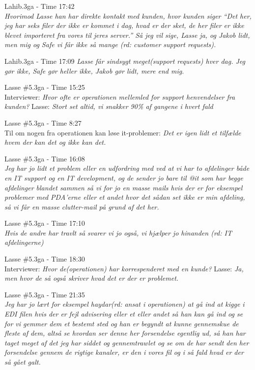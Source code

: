 \begin{thebibliography}{9}
	Lahib.3ga - Time 17:42\\
	\textit{Hvorimod Lasse han har direkte kontakt med kunden, hvor kunden siger “Det her, jeg har seks filer der ikke er kommet i dag, hvad er der sket, de her filer er ikke blevet importeret fra vores til jeres server.” Så jeg vil sige, Lasse ja, og Jakob lidt, men mig og Safe vi får ikke så mange \emph{(rd: customer support requests)}.}

	Lahib.3ga - Time 17:09
	\textit{Lasse får sindsygt meget(support requests) hver dag. Jeg gør ikke, Safe gør heller ikke, Jakob gør lidt, mere end mig.}

	Lasse \#5.3ga - Time 15:25 \\
	Interviewer: \textit{Hvor ofte er operationen mellemled for support henvendelser fra kunden?} Lasse: \textit{Stort set altid, vi snakker 90\% af gangene i hvert fald}

	Lasse \#5.3ga - Time 8:27 \\
	Til om nogen fra operationen kan løse it-problemer: \textit{Det er igen lidt et tilfælde hvem der kan det og ikke kan det.}

	Lasse \#5.3ga - Time 16:08 \\
	\textit{Jeg har jo lidt et problem eller en udfordring med ved at vi har to afdelinger både en IT support og en IT development, og de sender jo bare til @it som har begge afdelinger blandet sammen så vi for jo en masse mails hvis der er for eksempel problemer med PDA’erne eller et andet hvor det sådan set ikke er min afdeling, så vi får en masse clutter-mail på grund af det her.}

	Lasse \#5.3ga - Time 17:10 \\
	\textit{Hvis de andre har travlt så svarer vi jo også, vi hjælper jo hinanden \emph{(rd: IT afdelingerne)}}

	Lasse \#5.3ga - Time 18:30 \\
	Interviewer: \textit{Hvor de(operationen) har korrespenderet med en kunde?} Lasse: \textit{Ja, men hvor de så også skriver hvad det er der er problemet.}

	Lasse \#5.3ga - Time 21:35 \\
	\textit{Jeg har jo lært for eksempel haydar\emph{(rd: ansat i operationen)} at gå ind at kigge i EDI filen hvis der er fejl advisering eller et eller andet så han kan gå ind og se for vi gemmer dem et bestemt sted og han er begyndt at kunne gennemskue de fleste af dem, altså se hvordan ser denne her forsendelse egentlig ud, så han har taget meget af det jeg har siddet og gennemtrawlet og se om de har sendt den her forsendelse gennem de rigtige kanaler, er den i vores fil og i så fald hvad er der så gået galt.}


\end{thebibliography}
